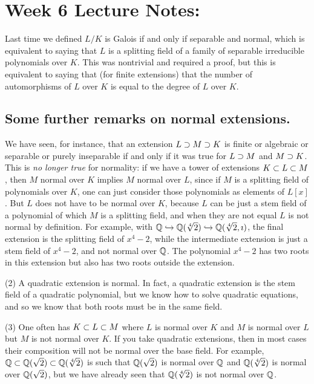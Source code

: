 \section[Galois correspondence and first examples.]{Week 6 Lecture Notes: }
Last time we defined $L/K$ is Galois if and only if separable and normal, which is equivalent to saying that $L$ is a splitting field of a family of separable irreducible polynomials over $K$.
This was nontrivial and required a proof, but this is equivalent to saying that (for finite extensions) that the number of automorphisms of $L$ over $K$ is equal to the degree of $L$ over $K$.

\subsection{Some further remarks on normal extensions.}
We have seen, for instance, that an extension $L \supset M \supset K$ is finite or algebraic or separable or purely inseparable if and only if it was true for $L \supset M$ and $M \supset K$.
This is \emph{no longer true} for normality: if we have a tower of extensions $K \subset L \subset M$, then $M$ normal over $K$ implies $M$ normal over $L$, since if $M$ is a splitting field of polynomials over $K$, one can just consider those polynomials as elements of $L[x]$.
But $L$ does not have to be normal over $K$, because $L$ can be just a stem field of a polynomial of which $M$ is a splitting field, and when they are not equal $L$ is not normal by definition.
For example, with $\mathbb{Q} \hookrightarrow \mathbb{Q}(\sqrt[4]{2}) \hookrightarrow \mathbb{Q}(\sqrt[4]{2}, \imath)$, the final extension is the splitting field of $x^4 - 2$, while the intermediate extension is just a stem field of $x^4 - 2$, and not normal over $\mathbb{Q}$.
The polynomial $x^4 - 2$ has two roots in this extension but also has two roots outside the extension.

(2) A quadratic extension is normal.
In fact, a quadratic extension is the stem field of a quadratic polynomial, but we know how to solve quadratic equations, and so we know that both roots must be in the same field.

(3) One often has $K \subset L \subset M$ where $L$ is normal over $K$ and $M$ is normal over $L$ but $M$ is not normal over $K$.
If you take quadratic extensions, then in most cases their composition will not be normal over the base field.
For example, $\mathbb{Q} \subset \mathbb{Q}(\sqrt{2}) \subset \mathbb{Q}(\sqrt[4]{2})$ is such that $\mathbb{Q}(\sqrt{2})$ is normal over $\mathbb{Q}$ and $\mathbb{Q}(\sqrt[4]{2})$ is normal over $\mathbb{Q}(\sqrt{2})$, but we have already seen that $\mathbb{Q}(\sqrt[4]{2})$ is not normal over $\mathbb{Q}$.

